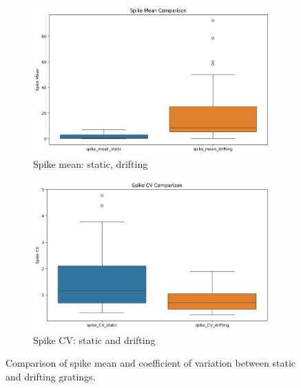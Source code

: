\documentclass[10pt,twocolumn]{article}
\begin{document}
\begin{figure}[H]
  \centering
  \begin{subfigure}[b]{0.48\linewidth}
    \centering
    \includegraphics[width=\linewidth]{report_images/spike_mean_comparison.png}
    \caption{Spike mean: static, drifting}
    \label{fig:spike_mean}
  \end{subfigure}
  \hfill
  \begin{subfigure}[b]{0.48\linewidth}
    \centering
    \includegraphics[width=\linewidth]{report_images/spike_CV_comparison.png}
    \caption{Spike CV: static and drifting}
    \label{fig:spike_cv}
  \end{subfigure}
  \caption{Comparison of spike mean and coefficient of variation between static and drifting gratings.}
  \label{fig:spike_stats_comparison}
\end{figure}
\end{document}
